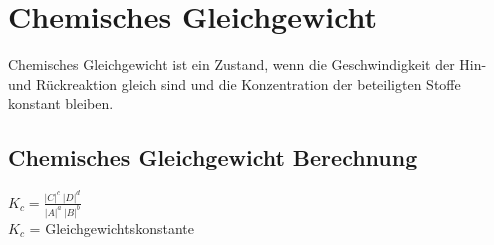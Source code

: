 \section{Chemisches Gleichgewicht} \label{sec:chemisches_gleichgewicht}
Chemisches Gleichgewicht ist ein Zustand, wenn die Geschwindigkeit der Hin- und Rückreaktion gleich sind und die Konzentration der beteiligten Stoffe konstant bleiben.

\subsection{Chemisches Gleichgewicht Berechnung}
$K_c = \frac{|C|^c\ |D|^d}{|A|^a\ |B|^b}$ \\
$K_c$ = Gleichgewichtskonstante
